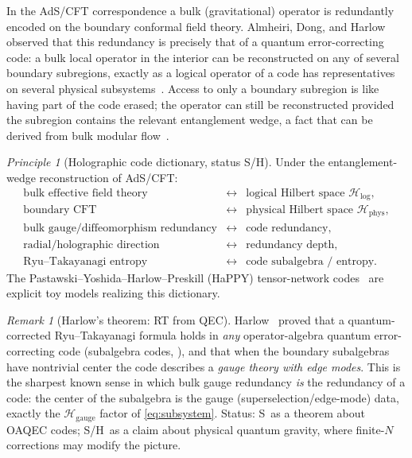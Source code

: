 \documentclass[12pt]{article}
\theoremstyle{definition}
\theoremstyle{remark}
\newtheorem{remark}[theorem]{Remark}
\newtheorem{principle}[theorem]{Principle}
\newcommand{\Ho}{\mathcal{H}}
\newcommand{\Hphys}{\Ho_{\mathrm{phys}}}
\newcommand{\Hlog}{\Ho_{\mathrm{log}}}
\newcommand{\Hgauge}{\Ho_{\mathrm{gauge}}}
\newcommand{\Ss}{\textsf{S}}
\newcommand{\Hh}{\textsf{H}}
\begin{document}
In the AdS/CFT correspondence a bulk (gravitational) operator is redundantly encoded on
the boundary conformal field theory. Almheiri, Dong, and Harlow~\cite{ADH} observed that
this redundancy is precisely that of a quantum error-correcting code: a bulk local
operator in the interior can be reconstructed on any of several boundary subregions,
exactly as a logical operator of a code has representatives on several physical
subsystems~\cite{DongHarlowWall}. Access to
only a boundary subregion is like having part of the code erased; the operator can still
be reconstructed provided the subregion contains the relevant entanglement wedge, a fact
that can be derived from bulk modular flow~\cite{EGH}.

\begin{principle}[Holographic code dictionary, status \Ss/\Hh]
\label{prin:holo}
Under the entanglement-wedge reconstruction of AdS/CFT:
\[
\begin{array}{lcl}
\text{bulk effective field theory} &\leftrightarrow& \text{logical Hilbert space }\Hlog,\\
\text{boundary CFT} &\leftrightarrow& \text{physical Hilbert space }\Hphys,\\
\text{bulk gauge/diffeomorphism redundancy} &\leftrightarrow& \text{code redundancy},\\
\text{radial/holographic direction} &\leftrightarrow& \text{redundancy depth},\\
\text{Ryu--Takayanagi entropy} &\leftrightarrow& \text{code subalgebra / entropy}.
\end{array}
\]
The Pastawski--Yoshida--Harlow--Preskill (HaPPY) tensor-network
codes~\cite{HaPPY} are explicit toy models realizing this dictionary.
\end{principle}

\begin{remark}[Harlow's theorem: RT from QEC]
\label{rem:harlow}
Harlow~\cite{HarlowRT} proved that a quantum-corrected Ryu--Takayanagi formula holds in
\emph{any}
operator-algebra quantum error-correcting code (subalgebra codes,
), and that when the boundary subalgebras have nontrivial center the
code describes a \emph{gauge theory with edge modes}. This is the sharpest known sense in
which bulk gauge redundancy \emph{is} the redundancy of a code: the center of the
subalgebra is the gauge (superselection/edge-mode) data, exactly the $\Hgauge$ factor of
\eqref{eq:subsystem}. Status: \Ss\ as a theorem about OAQEC codes; \Ss/\Hh\ as a claim
about physical quantum gravity, where finite-$N$ corrections may modify the picture.
\end{remark}
\end{document}
